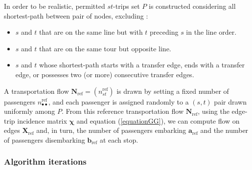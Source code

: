 \documentclass{bmcart}
\begin{document}
In order to be realistic, permitted $st$-trips set $P$ is constructed considering all shortest-path between pair of nodes, excluding :
\begin{itemize}
\item $s$ and $t$ that are on the same line but with $t$ preceding $s$ in the line order.
\item $s$ and $t$ that are on the same tour but opposite line.
\item $s$ and $t$ whose shortest-path starts with a transfer edge, ends with a transfer edge, or possesses two (or more) consecutive transfer edges.
\end{itemize}

A transportation flow $\mathbf{N}_\text{ref} = (n^\text{ref}_{st})$ is drawn by setting a fixed number of passengers $n^\text{ref}_{\bullet \bullet}$, and each passenger is assigned randomly to a $(s, t)$ pair drawn uniformly among $P$. From this reference transportation flow $\mathbf{N}_\text{ref}$, using the edge-trip incidence matrix $\bm{\chi}$ and equation (\ref{equationGG}), we can compute flow on edges $\mathbf{X}_\text{ref}$ and, in turn, the number of passengers embarking $\mathbf{a}_\text{ref}$ and the number of passengers disembarking $\mathbf{b}_\text{ref}$ at each stop.


\subsubsection{Algorithm iterations}
\label{algorithm_iterations}
\end{document}
